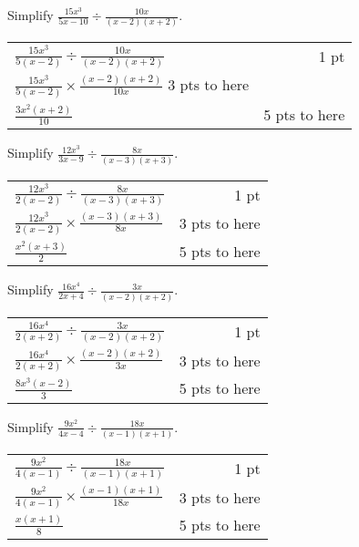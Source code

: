 {
	Simplify $\displaystyle \frac{15x^3}{5x-10}\div\frac{10x}{(x-2)(x+2)}$.
}
{
	\begin{tabular}{l r}
	$\frac{15x^3}{5(x-2)}\div\frac{10x}{(x-2)(x+2)}$ & 1 pt \\
	$\frac{15x^3}{5(x-2)} \times \frac{(x-2)(x+2)}{10x}$ 3 pts to here\\
	$\frac{3x^2(x+2)}{10}$ & 5 pts to here
	\end{tabular}
}

{
	Simplify $\displaystyle \frac{12x^3}{3x-9}\div\frac{8x}{(x-3)(x+3)}$.
}
{
	\begin{tabular}{l r}
	$\frac{12x^3}{2(x-2)}\div\frac{8x}{(x-3)(x+3)}$ & 1 pt \\
	$\frac{12x^3}{2(x-2)} \times \frac{(x-3)(x+3)}{8x}$ & 3 pts to here\\
	$\frac{x^2(x+3)}{2}$ & 5 pts to here
	\end{tabular}
}


{
	Simplify $\displaystyle \frac{16x^4}{2x+4}\div\frac{3x}{(x-2)(x+2)}$.
}
{
	\begin{tabular}{l r}
	$\frac{16x^4}{2(x+2)}\div\frac{3x}{(x-2)(x+2)}$ & 1 pt \\
	$\frac{16x^4}{2(x+2)} \times \frac{(x-2)(x+2)}{3x}$ & 3 pts to here\\
	$\frac{8x^3(x-2)}{3}$ & 5 pts to here
	\end{tabular}
}

{
	Simplify $\displaystyle \frac{9x^2}{4x-4}\div\frac{18x}{(x-1)(x+1)}$.
}
{
	\begin{tabular}{l r}
	$\frac{9x^2}{4(x-1)}\div\frac{18x}{(x-1)(x+1)}$ & 1 pt \\
	$\frac{9x^2}{4(x-1)} \times \frac{(x-1)(x+1)}{18x}$ & 3 pts to here\\
	$\frac{x(x+1)}{8}$ & 5 pts to here
	\end{tabular}
}